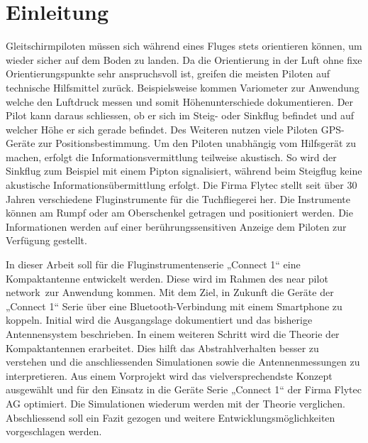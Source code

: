 \newpage
\section{Einleitung}
Gleitschirmpiloten müssen sich während eines Fluges stets orientieren können, um wieder sicher auf dem Boden zu landen. Da die Orientierung in der Luft ohne fixe Orientierungspunkte sehr anspruchsvoll ist, greifen die meisten Piloten auf technische Hilfsmittel zurück. Beispielsweise kommen Variometer zur Anwendung welche den Luftdruck messen und somit Höhenunterschiede dokumentieren. Der Pilot kann daraus schliessen, ob er sich im Steig- oder Sinkflug befindet und auf welcher Höhe er sich gerade befindet. Des Weiteren nutzen viele Piloten GPS-Geräte zur Positionsbestimmung. Um den Piloten unabhängig vom Hilfsgerät zu machen, erfolgt die Informationsvermittlung teilweise akustisch. So wird der Sinkflug zum Beispiel mit einem Pipton signalisiert, während beim Steigflug keine akustische Informationsübermittlung erfolgt. Die Firma Flytec stellt seit über 30 Jahren verschiedene Fluginstrumente für die Tuchfliegerei her. Die Instrumente können am Rumpf oder am Oberschenkel getragen und positioniert werden. Die Informationen werden auf einer berührungssensitiven Anzeige dem Piloten zur Verfügung gestellt. 

In dieser Arbeit soll für die Fluginstrumentenserie „Connect 1“ eine Kompaktantenne entwickelt werden. Diese wird im Rahmen des \glqq near pilot network\grqq \ zur Anwendung kommen. Mit dem Ziel, in Zukunft die Geräte der „Connect 1“ Serie über eine Bluetooth-Verbindung mit einem Smartphone zu koppeln. Initial wird die Ausgangslage dokumentiert und das bisherige Antennensystem beschrieben. In einem weiteren Schritt wird die Theorie der Kompaktantennen erarbeitet. Dies hilft das Abstrahlverhalten besser zu verstehen und die anschliessenden Simulationen sowie die Antennenmessungen zu interpretieren. Aus einem Vorprojekt wird das vielversprechendste Konzept ausgewählt und für den Einsatz in die Geräte Serie „Connect 1“ der Firma Flytec AG optimiert. Die Simulationen wiederum werden mit der Theorie verglichen. Abschliessend soll ein Fazit gezogen und weitere Entwicklungsmöglichkeiten vorgeschlagen werden.

